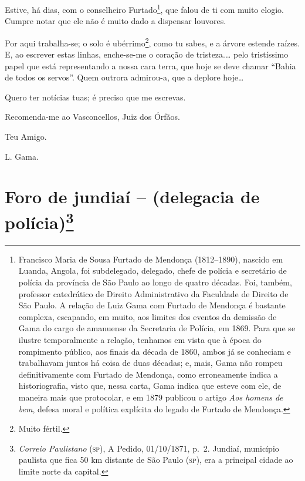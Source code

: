 Estive, há dias, com o conselheiro Furtado\footnote{ Francisco Maria de
  Sousa Furtado de Mendonça (1812--1890), nascido em Luanda, Angola, foi
  subdelegado, delegado, chefe de polícia e secretário de polícia da
  província de São Paulo ao longo de quatro décadas. Foi, também,
  professor catedrático de Direito Administrativo da Faculdade de
  Direito de São Paulo. A relação de Luiz Gama com Furtado de Mendonça é
  bastante complexa, escapando, em muito, aos limites dos eventos da
  demissão de Gama do cargo de amanuense da Secretaria de Polícia, em
  1869. Para que se ilustre temporalmente a relação, tenhamos em vista
  que à época do rompimento público, aos finais da década de 1860, ambos
  já se conheciam e trabalhavam juntos há coisa de duas décadas; e,
  mais, Gama não rompeu definitivamente com Furtado de Mendonça, como
  erroneamente indica a historiografia, visto que, nessa carta, Gama
  indica que esteve com ele, de maneira mais que protocolar, e em 1879
  publicou o artigo \emph{Aos homens de bem}, defesa moral e política
  explícita do legado de Furtado de Mendonça.}, que falou de ti com
muito elogio. Cumpre notar que ele não é muito dado a dispensar
louvores.

Por aqui {trabalha-se}; o solo é ubérrimo\footnote{ Muito fértil.},
como tu sabes, e a árvore estende raízes. E, ao escrever estas linhas,
enche-se-me o coração de tristeza.\ldots{} pelo tristíssimo papel que
está representando a nossa cara terra, que hoje se deve chamar ``Bahia de
todos os servos''. Quem outrora admirou-a, que a deplore hoje\ldots{}

Quero ter notícias tuas; é preciso que me escrevas.

Recomenda-me ao Vasconcellos, Juiz dos Órfãos.

Teu Amigo.

L. Gama.

\chapter{Foro de jundiaí -- (delegacia de polícia)\footnote{\emph{Correio Paulistano} (\textsc{sp}), A Pedido, 01/10/1871,
  p.~2. Jundiaí, município paulista que fica 50 km distante de São Paulo
  (\textsc{sp}), era a principal cidade ao limite norte da capital.}} %

